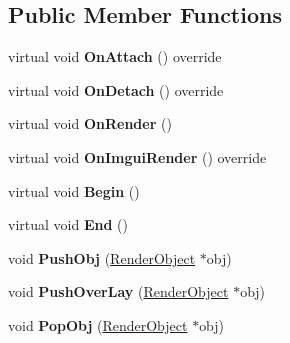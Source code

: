 \subsection*{Public Member Functions}
\begin{DoxyCompactItemize}
\item 
\mbox{\label{class_g_b_1_1_renderer_a984ff5ea8e9bbcabd51b27665fa71f0e}} 
virtual void {\bfseries On\+Attach} () override
\item 
\mbox{\label{class_g_b_1_1_renderer_adb6fe8d65b34be96b39cb3b6e9e7df8e}} 
virtual void {\bfseries On\+Detach} () override
\item 
\mbox{\label{class_g_b_1_1_renderer_aa81a07b0dda8914d095d7009e66c50af}} 
virtual void {\bfseries On\+Render} ()
\item 
\mbox{\label{class_g_b_1_1_renderer_aaf255cf757d23fe995d480c7d0d96bcb}} 
virtual void {\bfseries On\+Imgui\+Render} () override
\item 
\mbox{\label{class_g_b_1_1_renderer_a9cf053b4ca0828db53c3483e7795fad6}} 
virtual void {\bfseries Begin} ()
\item 
\mbox{\label{class_g_b_1_1_renderer_a0ef40f867065bdc6ac3fcbbb51eff818}} 
virtual void {\bfseries End} ()
\item 
\mbox{\label{class_g_b_1_1_renderer_a75f5395cc66a66aff9d6d9923277c461}} 
void {\bfseries Push\+Obj} (\mbox{\hyperlink{class_g_b_1_1_render_object}{Render\+Object}} $\ast$obj)
\item 
\mbox{\label{class_g_b_1_1_renderer_a478315202ce878158ddf5e1d365b7f00}} 
void {\bfseries Push\+Over\+Lay} (\mbox{\hyperlink{class_g_b_1_1_render_object}{Render\+Object}} $\ast$obj)
\item 
\mbox{\label{class_g_b_1_1_renderer_a5d8735400185fbe79cc8e887f2a8c1a4}} 
void {\bfseries Pop\+Obj} (\mbox{\hyperlink{class_g_b_1_1_render_object}{Render\+Object}} $\ast$obj)
\item 
\mbox{\label{class_g_b_1_1_renderer_abf1baac2a9824934ca80fa074f8adb91}} 

\end{DoxyCompactItemize}

